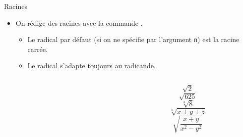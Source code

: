 \begin{frame}[fragile]{Racines}
	\begin{itemize}
		\item On rédige des racines avec la commande .
		\begin{itemize}
			\scriptsize
			\item Le radical par défaut (si on ne spécifie par l'argument \texttt{n}) est la racine carrée.
			\item Le radical s'adapte toujours au radicande.
		\end{itemize}
		\begin{columns}
			\begin{column}{.4\textwidth}
			\vspace{-4.5mm}
\begin{codesource}
	
		
	
		
	
	
	
	
\end{codesource}
			\end{column}
			\begin{column}{.4\textwidth}
				\begin{equation*}					
					\sqrt{2}		
				\end{equation*}	
				\begin{equation*}
					\sqrt{625}
				\end{equation*}		
				\begin{equation*}				
					\sqrt[3]{8}				
				\end{equation*}
				\begin{equation*}
					\sqrt[n]{x + y + z}
				\end{equation*}
				\begin{equation*}
					\sqrt{\frac{x + y}{x^2 - y^2}}
				\end{equation*}
			\end{column}
		\end{columns}
	\end{itemize}
\end{frame}

